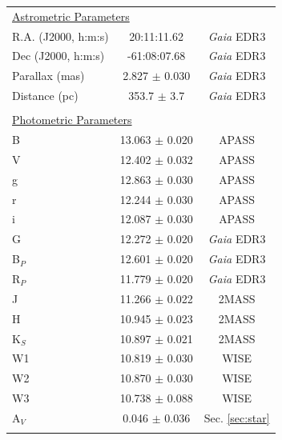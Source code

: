\documentclass{aa}
\begin{document}
\begin{table}
{\begin{tabular}{lcc}
    \\
    \multicolumn{3}{l}{\underline{Astrometric Parameters}}\\
    \noalign{\smallskip}
    \noalign{\smallskip}
    R.A. (J2000, h:m:s)		&	 20:11:11.62  	&  \textit{Gaia} EDR3	\\
	Dec	 (J2000, h:m:s)		&	 -61:08:07.68	&  \textit{Gaia} EDR3	\\
    Parallax  (mas) & 2.827 $\pm$ 0.030 & \textit{Gaia} EDR3 \\
    Distance  (pc) & 353.7 $\pm$ 3.7 & \textit{Gaia} EDR3 \\
    \\
    \multicolumn{3}{l}{\underline{Photometric Parameters}}\\
    \noalign{\smallskip}
    \noalign{\smallskip}
	B 		& 13.063 $\pm$ 0.020  	& APASS \\ %
	V 		& 12.402 $\pm$ 0.032	& APASS \\
	g       & 12.863 $\pm$ 0.030 & APASS \\
	r       & 12.244 $\pm$ 0.030 & APASS \\
	i       & 12.087 $\pm$ 0.030 & APASS \\
    G 		& 12.272 $\pm$ 0.020	& \textit{Gaia} EDR3 \\
    B$_P$ 		& 12.601 $\pm$ 0.020	& \textit{Gaia} EDR3 \\
    R$_P$ 		& 11.779 $\pm$ 0.020    & \textit{Gaia} EDR3 \\
    J 		& 11.266 $\pm$ 0.022	& 2MASS \\
   	H 		& 10.945 $\pm$ 0.023	& 2MASS \\
	K$_S$       & 10.897 $\pm$ 0.021	& 2MASS \\
    W1      & 10.819 $\pm$ 0.030	& WISE \\
    W2      & 10.870 $\pm$ 0.030    & WISE \\
    W3      & 10.738 $\pm$ 0.088    & WISE \\
    A$_{V}$	& 0.046 $\pm$ 0.036 & Sec. \ref{sec:star} \\
    \\
    

\end{tabular}}
\end{table}
\end{document}

